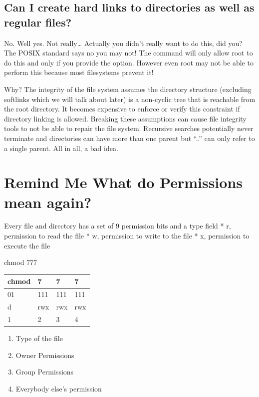 \subsection{Can I create hard links to directories as well as regular files?}

No. Well yes. Not really\ldots{} Actually you didn't really want to do this, did you? The POSIX standard says no you may not! The  command will only allow root to do this and only if you provide the  option. However even root may not be able to perform this because most filesystems prevent it!

Why? The integrity of the file system assumes the directory structure (excluding softlinks which we will talk about later) is a non-cyclic tree that is reachable from the root directory. It becomes expensive to enforce or verify this constraint if directory linking is allowed. Breaking these assumptions can cause file integrity tools to not be able to repair the file system. Recursive searches potentially never terminate and directories can have more than one parent but ``..'' can only refer to a single parent. All in all, a bad idea.

\section{Remind Me What do Permissions mean again?}\label{remind-me-what-do-permissions-mean-again}

Every file and directory has a set of 9 permission bits and a type field * r, permission to read the file * w, permission to write to the file * x, permission to execute the file

chmod 777

\begin{longtable}[c]{@{}llll@{}}
\toprule
chmod & 7 & 7 & 7\tabularnewline
\midrule
\endhead
01 & 111 & 111 & 111\tabularnewline
d & rwx & rwx & rwx\tabularnewline
1 & 2 & 3 & 4\tabularnewline
\bottomrule
\end{longtable}

\begin{enumerate}
\def\labelenumi{\arabic{enumi}.}
\tightlist
\item
  Type of the file
\item
  Owner Permissions
\item
  Group Permissions
\item
  Everybody else's permission
\end{enumerate}

